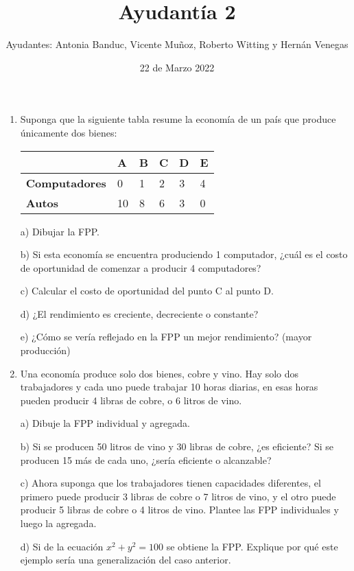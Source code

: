 \documentclass{article}
\title{Ayudantía 2}
\author{Ayudantes: Antonia Banduc, Vicente Muñoz,
Roberto Witting y Hernán Venegas
}
\begin{document}
\date{22 de Marzo 2022}
\maketitle

\begin{enumerate}
    \item Suponga que la siguiente tabla resume la economía de un país que produce únicamente dos bienes: 
    
    \begin{table}[h!]
    \centering
    \begin{tabular}{|l|l|l|l|l|l|}
\hline
                      & \textbf{A} & \textbf{B} & \textbf{C} & \textbf{D} & \textbf{E} \\ \hline
\textbf{Computadores} & 0          & 1          & 2          & 3          & 4          \\ \hline
\textbf{Autos}        & 10         & 8          & 6          & 3          & 0          \\ \hline
\end{tabular}
\end{table}

a) Dibujar la FPP.

b) Si esta economía se encuentra produciendo 1 computador, ¿cuál es el costo de oportunidad de comenzar a producir 4 computadores?

c) Calcular el costo de oportunidad del punto C al punto D.

d) ¿El rendimiento es creciente, decreciente o constante?

e) ¿Cómo se vería reflejado en la FPP un mejor rendimiento? (mayor producción)

    \item Una economía produce solo dos bienes, cobre y vino. Hay solo dos trabajadores y cada uno puede trabajar 10 horas diarias, en esas horas pueden producir 4 libras de cobre, o 6 litros de vino.

a) Dibuje la FPP individual y agregada.

b) Si se producen 50 litros de vino y 30 libras de cobre, ¿es eficiente? Si se producen 15 más de cada uno, ¿sería eficiente o alcanzable?

c) Ahora suponga que los trabajadores tienen capacidades diferentes, el primero puede producir 3 libras de cobre o 7 litros de vino, y el otro puede producir 5 libras de cobre o 4 litros de vino.
Plantee las FPP individuales y luego la agregada.

d) Si de la ecuación $x^2+y^2 = 100$ se obtiene la FPP. Explique por qué este ejemplo sería una generalización del caso anterior.


\end{enumerate}
\end{document}
